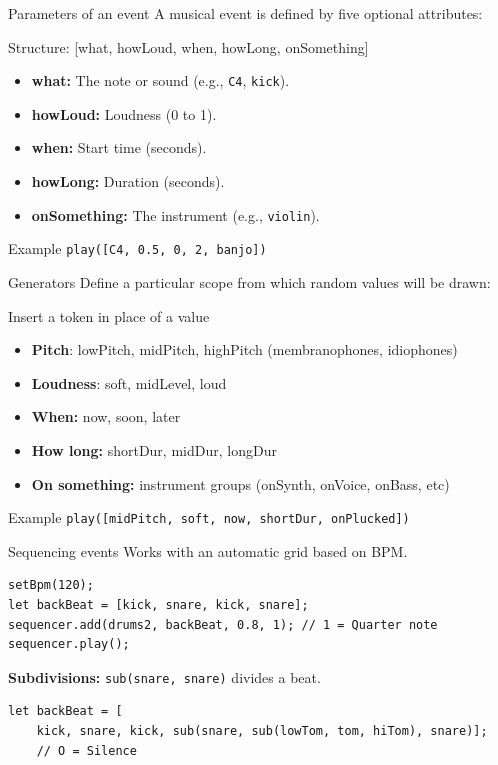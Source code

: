 \documentclass[10pt]{beamer}
\begin{document}
\begin{frame}{Parameters of an event}
A musical event is defined by five optional attributes:
    \begin{block}{Structure: [what, howLoud, when, howLong, onSomething]}
        \begin{itemize}
            \item \textbf{what:} The note or sound (e.g., \texttt{C4}, \texttt{kick}).
            \item \textbf{howLoud:} Loudness (0 to 1).
            \item \textbf{when:} Start time (seconds).
            \item \textbf{howLong:} Duration (seconds).
            \item \textbf{onSomething:} The instrument (e.g., \texttt{violin}).
        \end{itemize}
    \end{block}
    \begin{exampleblock}{Example}
        \texttt{play([C4, 0.5, 0, 2, banjo])}
    \end{exampleblock}
\end{frame}

\begin{frame}{Generators}
Define a particular scope from which random values will be drawn:
	\begin{block}{Insert a token in place of a value}
        \begin{itemize}
	    \item \textbf{Pitch}: lowPitch, midPitch, highPitch (membranophones, idiophones)
            \item \textbf{Loudness}: soft, midLevel, loud
            \item \textbf{When:} now, soon, later
            \item \textbf{How long:} shortDur, midDur, longDur
	    \item \textbf{On something:} instrument groups (onSynth, onVoice, onBass, etc)
        \end{itemize}
    \end{block}
    \begin{exampleblock}{Example}
        \texttt{play([midPitch, soft, now, shortDur, onPlucked])}
    \end{exampleblock}
\end{frame}

\begin{frame}[fragile]{Sequencing events}
    Works with an automatic grid based on BPM.
    \begin{lstlisting}
setBpm(120);
let backBeat = [kick, snare, kick, snare];
sequencer.add(drums2, backBeat, 0.8, 1); // 1 = Quarter note
sequencer.play();
    \end{lstlisting}
    \textbf{Subdivisions:} \texttt{sub(snare, snare)} divides a beat.

    \begin{lstlisting}
let backBeat = [
	kick, snare, kick, sub(snare, sub(lowTom, tom, hiTom), snare)];
	// O = Silence
    \end{lstlisting}
\end{frame}
\end{document}

